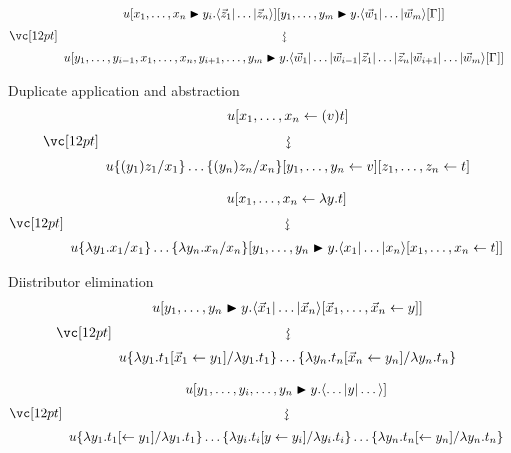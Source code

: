\documentclass{amsart}
\begin{document}
\[
\displayrewrite
  { u\diistr x{y_i}{\ttup*z}\diistr[m]yy{\ttup*[m]w\G} }
  { u\diistr*{y_1,\dotsc,y_{i-1},\vv x, y_{i+1}, \dotsc, y_m} y {
  \tup*{\vv*w_1|\dotso|\vv*w_{i-1}|\vv*z_1|\dotso|\vv*z_n|\vv*w_{i+1}|\dotso|\vv*w_m}
  \G} }
\]

\bigskip
\bigskip
\bigskip

\noindent
Duplicate application and abstraction
\[
\displayrewrite
{ u\share x{(v)t} }
{ u\subsapp xyz\share yv\share zt }
\]

\bigskip

\[
\displayrewrite
  { u\share x{\lambda y.t} }
  { u\subsabs xyx\diistr yy{\ttup x\share xt} }
\]

\bigskip
\bigskip
\bigskip

\noindent
Diistributor elimination
\[
\displayrewrite
  { u\diistr yy{\ttup*x\share{\vv*x}y} }
  { u\sub{\lambda y_1.t_1}{\lambda y_1.t_1\share*{\vv*x_1}{y_1}} \dotso
     \sub{\lambda y_n.t_n}{\lambda y_n.t_n\share*{\vv*x_n}{y_n}} }
\]

\bigskip

\[
\displayrewrite
  { u\diistr*{y_1,\dotsc,y_i,\dotsc,y_n}y{\tup*{\dotso|y|\dotso}} }
  { u\sub{\lambda y_1.t_1}{\lambda y_1.t_1\share*{}{y_1}} \dotso
     \sub{\lambda y_i.t_i}{\lambda y_i.t_i\share*{y}{y_i}} \dotso
     \sub{\lambda y_n.t_n}{\lambda y_n.t_n\share*{}{y_n}} }
\]
\end{document}
